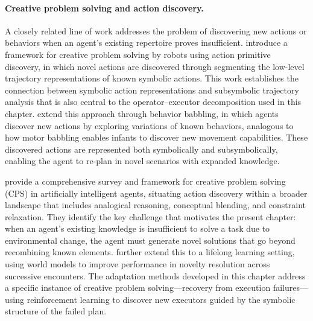 \paragraph{Creative problem solving and action discovery.}
A closely related line of work addresses the problem of discovering new actions or behaviors when an agent's existing repertoire proves insufficient. \citet{gizzi2019creative} introduce a framework for creative problem solving by robots using action primitive discovery, in which novel actions are discovered through segmenting the low-level trajectory representations of known symbolic actions. This work establishes the connection between symbolic action representations and subsymbolic trajectory analysis that is also central to the operator--executor decomposition used in this chapter. \citet{gizzi2021behavior} extend this approach through behavior babbling, in which agents discover new actions by exploring variations of known behaviors, analogous to how motor babbling enables infants to discover new movement capabilities. These discovered actions are represented both symbolically and subsymbolically, enabling the agent to re-plan in novel scenarios with expanded knowledge.

\citet{gizzi2022cps} provide a comprehensive survey and framework for creative problem solving (CPS) in artificially intelligent agents, situating action discovery within a broader landscape that includes analogical reasoning, conceptual blending, and constraint relaxation. They identify the key challenge that motivates the present chapter: when an agent's existing knowledge is insufficient to solve a task due to environmental change, the agent must generate novel solutions that go beyond recombining known elements. \citet{gizzi2022lifelong} further extend this to a lifelong learning setting, using world models to improve performance in novelty resolution across successive encounters. The adaptation methods developed in this chapter address a specific instance of creative problem solving---recovery from execution failures---using reinforcement learning to discover new executors guided by the symbolic structure of the failed plan.

